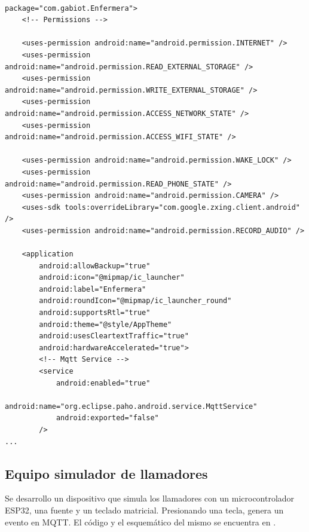 \begin{lstlisting}[label=cod:AndroidMan,caption=Modificaciones al Android Manifest.]  % Start your code-block

package="com.gabiot.Enfermera">
    <!-- Permissions -->

    <uses-permission android:name="android.permission.INTERNET" />
    <uses-permission android:name="android.permission.READ_EXTERNAL_STORAGE" />
    <uses-permission android:name="android.permission.WRITE_EXTERNAL_STORAGE" />
    <uses-permission android:name="android.permission.ACCESS_NETWORK_STATE" />
    <uses-permission android:name="android.permission.ACCESS_WIFI_STATE" />

    <uses-permission android:name="android.permission.WAKE_LOCK" />
    <uses-permission android:name="android.permission.READ_PHONE_STATE" />
    <uses-permission android:name="android.permission.CAMERA" />
    <uses-sdk tools:overrideLibrary="com.google.zxing.client.android" />
    <uses-permission android:name="android.permission.RECORD_AUDIO" />

    <application
        android:allowBackup="true"
        android:icon="@mipmap/ic_launcher"
        android:label="Enfermera"
        android:roundIcon="@mipmap/ic_launcher_round"
        android:supportsRtl="true"
        android:theme="@style/AppTheme"
        android:usesCleartextTraffic="true"
        android:hardwareAccelerated="true">
        <!-- Mqtt Service -->
        <service
            android:enabled="true"
            android:name="org.eclipse.paho.android.service.MqttService"
            android:exported="false"
        />
...

\end{lstlisting}
\pagebreak
\subsection{Equipo simulador de llamadores}

Se desarrollo un dispositivo que simula los llamadores con un microcontrolador ESP32, una fuente y un teclado matricial. Presionando una tecla, genera un evento en MQTT. El código y el esquemático del mismo se encuentra en \citep{WEBSITE:33}. 

